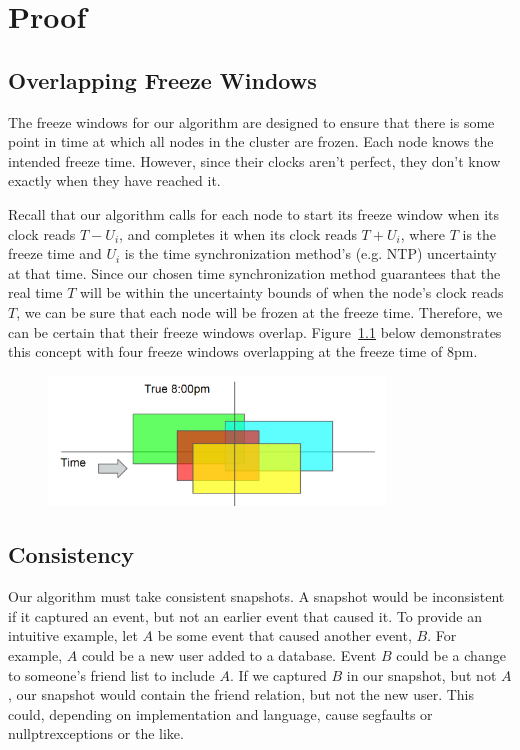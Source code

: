 \chapter{Proof}
\label{sec:proof}

\section{Overlapping Freeze Windows}

The freeze windows for our algorithm are designed to ensure
that there is some point in time at which all nodes in the cluster are
frozen. Each node knows the intended freeze time. However, since their
clocks aren't perfect, they don't know exactly when they have reached it.

Recall that our algorithm calls for each node to start its freeze
window when its clock reads $T - U_i$, and completes it when its clock
reads $T + U_i$, where $T$ is the freeze time and $U_i$ is the time 
synchronization method's (e.g. NTP) uncertainty  at that time. 
Since our chosen time synchronization method guarantees that the real 
time $T$ will be within the uncertainty bounds of when the node's 
clock reads $T$, we can be sure that each node will be frozen at the 
freeze time. Therefore, we can be certain that their freeze windows overlap. 
Figure~\ref{fig:overlapping-windows} below
demonstrates this concept with four freeze windows overlapping at the freeze 
time of 8pm.

\begin{figure}[h]
  \centering
  \caption{}
  \label{fig:overlapping-windows}
  \includegraphics[width=0.8\textwidth]{overlapping-windows.png}
\end{figure}

\section{Consistency}

Our algorithm must take consistent snapshots. A snapshot would be
inconsistent if it captured an event, but not an earlier event that
caused it. To provide an intuitive example, let $A$ be some event that
caused another event, $B$.  For example, $A$ could be a new user added
to a database. Event $B$ could be a change to someone's friend list to
include $A$. If we captured $B$ in our snapshot, but not $A$, our
snapshot would contain the friend relation, but not the new user. This
could, depending on implementation and language, cause segfaults or
nullptrexceptions or the like.

